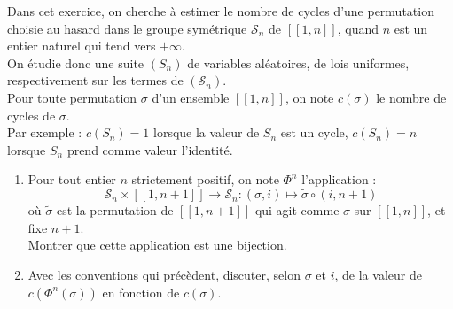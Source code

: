 \begin{exer}
Dans cet exercice, on cherche \`a estimer le nombre de cycles d'une permutation choisie au hasard dans le groupe sym\'etrique $\mathcal{S}_n$ de $[\![1,n]\!]$, quand $n$ est un entier naturel qui tend vers $+\infty$.\\
On \'etudie donc une suite $(S_n)$ de variables al\'eatoires, de lois uniformes, respectivement sur les termes de $(\mathcal{S}_n)$.\\
Pour toute permutation $\sigma$ d'un ensemble $[\![1,n]\!]$, on note $c(\sigma)$ le nombre de cycles de $\sigma$.\\
Par exemple : $c(S_n)=1$ lorsque la valeur de $S_n$ est un cycle, $c(S_n)=n$ lorsque $S_n$ prend comme valeur l'identit\'e.
\ligneinter
\vspace{-0.2pt}
\begin{enumerate}
\item Pour tout entier $n$ strictement positif, on note $\Phi^n$ l'application :
\[\mathcal{S}_n\times [\![1,n+1]\!] \longrightarrow \mathcal{S}_n : (\sigma ,i) \mapsto \tilde{\sigma}\circ (i , n+1)\]
o\`u $\tilde{\sigma}$ est la permutation de $[\![1,n+1]\!]$ qui agit comme $\sigma$ sur $[\![1,n]\!]$, et fixe $n+1$.\\
Montrer que cette application est une bijection.
\item Avec les conventions qui pr\'ec\`edent, discuter, selon $\sigma$ et $i$, de la valeur de $c(\Phi^n(\sigma))$ en fonction de $c(\sigma)$.


\end{enumerate}
\end{exer}

